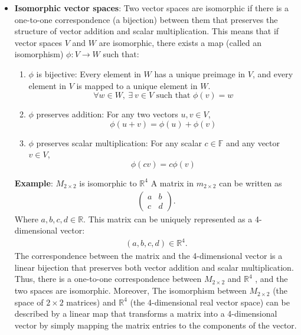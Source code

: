 \documentclass{report}
\begin{document}
\begin{itemize}
            \pagebreak 
        \item \textbf{Isomorphic vector spaces}:
            Two vector spaces are isomorphic if there is a one-to-one correspondence (a bijection) between them that preserves the structure of vector addition and scalar multiplication. This means that if vector spaces $V$ and $W$ are isomorphic, there exists a map (called an isomorphism) $\phi: V \to W$ such that:
            \begin{enumerate}
                \item $\phi$ is bijective: Every element in $W$ has a unique preimage in $V$, and every element in $V$ is mapped to a unique element in $W$.
                \[
                    \forall w \in W, \ \exists\ v \in V \text{ such that } \phi(v) = w
                \]
                \item $\phi$ preserves addition: For any two vectors $u, v \in V$,
                \[
                    \phi(u + v) = \phi(u) + \phi(v)
                \]
                \item $\phi$ preserves scalar multiplication: For any scalar $c \in \mathbb{F}$ and any vector $v \in V$,
                \[
                    \phi(cv) = c\phi(v)
                \]
            \end{enumerate}
            \bigbreak \noindent 
            \textbf{Example}: $M_{2\times 2}$ is isomorphic to $\mathbb{R}^{4} $
            \bigbreak \noindent 
            A matrix in $m_{2\times 2}$ can be written as 
            \begin{align*}
                \begin{pmatrix} a & b \\ c & d \end{pmatrix}
            .\end{align*}
            Where $a,b,c,d \in \mathbb{R}$. This matrix can be uniquely represented as a 4-dimensional vector:
            \begin{align*}
                (a,b,c,d) \in \mathbb{R}^{4}
            .\end{align*}
            \bigbreak \noindent 
            The correspondence between the matrix and the 4-dimensional vector is a linear bijection that preserves both vector addition and scalar multiplication. Thus, there is a one-to-one correspondence between $M_{2\times 2}$ and $\mathbb{R}^{4}$ , and the two spaces are isomorphic.
            \bigbreak \noindent 
            Moreover, 
            The isomorphism between $M_{2 \times 2}$ (the space of $2 \times 2$ matrices) and $\mathbb{R}^4$ (the 4-dimensional real vector space) can be described by a linear map that transforms a matrix into a 4-dimensional vector by simply mapping the matrix entries to the components of the vector.

\end{itemize}
\end{document}
